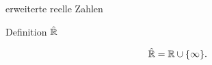 \documentclass[class=article, crop=false]{standalone}
\begin{document}
\begin{zettel}{erweiterte reelle Zahlen}

\begin{flashcard}[66tsojuu]{Definition $\hat{\mathbb{R}}$ }
	\begin{definition}
		\[
			\hat{\R } = \R \cup \set{\infty}
		.\]
	\end{definition}
\end{flashcard}

\end{zettel}
\end{document}
